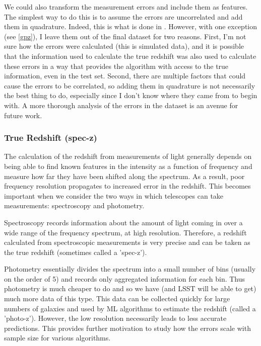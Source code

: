\documentclass[13pt]{amsart}
\begin{document}
      We could also transform the measurement errors and include them as features. The simplest way to do this is to assume the errors are uncorrelated and add them in quadrature. Indeed, this is what is done in \cite{graham}. However, with one exception (see \ref{gpz}), I leave them out of the final dataset for two reasons. First, I'm not sure how the errors were calculated (this is simulated data), and it is possible that the information used to calculate the true redshift was also used to calculate these errors in a way that provides the algorithm with access to the true information, even in the test set. Second, there are multiple factors that could cause the errors to be correlated, so adding them in quadrature is not necessarily the best thing to do, especially since I don't know where they came from to begin with. A more thorough analysis of the errors in the dataset is an avenue for future work.

    \subsubsection{True Redshift (spec-z)}

      The calculation of the redshift from measurements of light generally depends on being able to find known features in the intensity as a function of frequency and measure how far they have been shifted along the spectrum. As a result, poor frequency resolution propagates to increased error in the redshift. This becomes important when we consider the two ways in which telescopes can take measurements: spectroscopy and photometry.

      Spectroscopy records information about the amount of light coming in over a wide range of the frequency spectrum, at high resolution. Therefore, a redshift calculated from spectroscopic measurements is very precise and can be taken as the true redshift (sometimes called a 'spec-z').

      Photometry essentially divides the spectrum into a small number of bins (usually on the order of 5) and records only aggregated information for each bin. Thus photometry is much cheaper to do and so we have (and LSST will be able to get) much more data of this type. This data can be collected quickly for large numbers of galaxies and used by ML algorithms to estimate the redshift (called a 'photo-z'). However, the low resolution necessarily leads to less accurate predictions. This provides further motivation to study how the errors scale with sample size for various algorithms.
\end{document}
